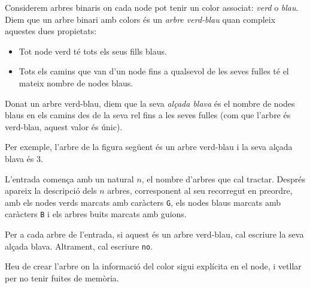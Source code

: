 
\Statement

Considerem arbres binaris on cada node pot tenir un color associat:
\emph{verd} o \emph{blau}. Diem que un arbre binari amb colors és un
\emph{arbre verd-blau} quan compleix aquestes dues propietats:

\begin{itemize}

\item Tot node verd té tots els seus fills blaus.

\item Tots els camins que van d'un node fins a qualsevol de les seves fulles té el mateix nombre de nodes blaus.

\end{itemize}


Donat un arbre verd-blau, diem que la seva  \emph{alçada blava} és el nombre de
nodes blaus en els camins des de la seva rel fins a les seves fulles
(com que l'arbre és verd-blau, aquest valor és únic).

\medskip

Per exemple, l'arbre de la figura següent és un arbre verd-blau i la seva alçada blava
és 3.


\Input

L’entrada comença amb un natural $n$, el nombre d’arbres que cal tractar.
Després apareix la descripció dels $n$ arbres, corresponent al seu recorregut en
preordre, amb els nodes verds marcats amb caràcters \texttt{G}, els nodes blaus marcats
amb caràcters \texttt{B} i els arbres buits marcats amb guions.


\Output

Per a cada arbre de l'entrada, si aquest és un arbre verd-blau, cal escriure  la
seva alçada blava. Altrament, cal escriure \texttt{no}.

\Observation

Heu de crear l'arbre on la informació del color sigui explícita en el node, i
vetllar per no tenir fuites de memòria.

\SampleTwoCol
